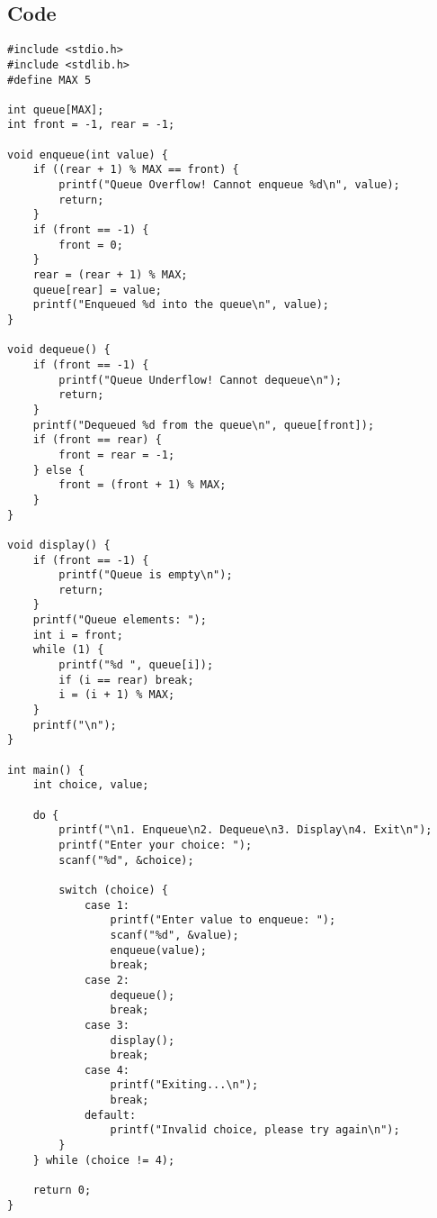 \documentclass[12pt,a4paper]{article}
\begin{document}
\subsection*{Code}
\begin{lstlisting}
#include <stdio.h>
#include <stdlib.h>
#define MAX 5

int queue[MAX];
int front = -1, rear = -1;

void enqueue(int value) {
    if ((rear + 1) % MAX == front) {
        printf("Queue Overflow! Cannot enqueue %d\n", value);
        return;
    }
    if (front == -1) {
        front = 0;
    }
    rear = (rear + 1) % MAX;
    queue[rear] = value;
    printf("Enqueued %d into the queue\n", value);
}

void dequeue() {
    if (front == -1) {
        printf("Queue Underflow! Cannot dequeue\n");
        return;
    }
    printf("Dequeued %d from the queue\n", queue[front]);
    if (front == rear) {
        front = rear = -1;
    } else {
        front = (front + 1) % MAX;
    }
}

void display() {
    if (front == -1) {
        printf("Queue is empty\n");
        return;
    }
    printf("Queue elements: ");
    int i = front;
    while (1) {
        printf("%d ", queue[i]);
        if (i == rear) break;
        i = (i + 1) % MAX;
    }
    printf("\n");
}

int main() {
    int choice, value;

    do {
        printf("\n1. Enqueue\n2. Dequeue\n3. Display\n4. Exit\n");
        printf("Enter your choice: ");
        scanf("%d", &choice);

        switch (choice) {
            case 1:
                printf("Enter value to enqueue: ");
                scanf("%d", &value);
                enqueue(value);
                break;
            case 2:
                dequeue();
                break;
            case 3:
                display();
                break;
            case 4:
                printf("Exiting...\n");
                break;
            default:
                printf("Invalid choice, please try again\n");
        }
    } while (choice != 4);

    return 0;
}
\end{lstlisting}

\newapge
\end{document}
